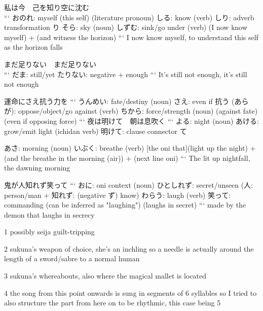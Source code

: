 私は今　己を知り空に沈む \\
```
        おのれ: myself (this self) (literature pronoun)
            しる: know (verb)
            しり: adverb transformation り
                そら: sky (noun)
                    しずむ: sink/go under (verb)
(I now know myself) + (and witness the horizon)
```
I now know myself, to understand this self as the horizon falls

まだ足りない　まだ足りない \\
```
だま: still/yet
たりない: negative + enough
```
It's still not enough, it's still not enough

運命にさえ抗う力を
```
うんめい: fate/destiny (noun)
さえ: even if
抗う (あらが): oppose/object/go against (verb)
ちから: force/strength (noun)
(against fate) (even if opposing force)
```
夜は明けて　朝は息吹く
```
よる: night (noun)
あける: grow/emit light (ichidan verb)
明けて: clause connector て

            あさ: morning (noun)
            いぶく: breathe (verb)
[the oni that](light up the night) + (and the breathe in the morning (air)) + (next line oni)
```
The lit up nightfall, the dawning morning

鬼が人知れず笑って
```
おに: oni context (noun)
ひとしれず: secret/unseen (人: person/man + 知れず: (negative ず) know)
わらう: laugh (verb)
笑って: commanding (can be inferred as "laughing")
(laughs in secret)
```
made by the demon that laughs in secrecy

{1} possibly seija guilt-tripping

{2} sukuna's weapon of choice, she's an inchling so a needle is actually around the length of a sword/sabre to a normal human

{3} sukuna's whereabouts, also where the magical mallet is located

{4} the song from this point onwards is sung in segments of 6 syllables so I tried to also structure the part from here on to be rhythmic, this case being 5
